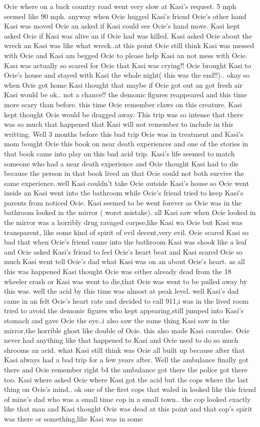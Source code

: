 \documentclass[12pt]{book}
\begin{document}
Ocie where on a back country road went very slow at Kasi's request. 5 mph seemed like 90 mph. anyway when Ocie hugged Kasi's friend Ocie's other hand Kasi was moved Ocie an asked if Kasi could see Ocie's hand move. Kasi kept asked Ocie if Kasi was alive an if Ocie had was killed. Kasi asked Ocie about the wreck an Kasi was like what wreck..at this point Ocie still think Kasi was messed with Ocie and Kasi am begged Ocie to please help Kasi an not mess with Ocie. Kasi was actually so scared for Ocie that Kasi was crying!! Ocie brought Kasi to Ocie's house and stayed with Kasi the whole night( this was the end!!).. okay so when Ocie got home Kasi thought that maybe if Ocie got out an got fresh air Kasi would be ok.. not a chance!! the demonic figures reappeared and this time more scary than before. this time Ocie remember claws on this creature. Kasi kept thought Ocie would be dragged away. This trip was so intense that there was so much that happened that Kasi will not remember to include in this writting. Well 3 months before this bad trip Ocie was in treatment and Kasi's mom bought Ocie this book on near death experiences and one of the stories in that book came into play on this bad acid trip. Kasi's life seemed to match someone who had a near death experience and Ocie thought Kasi had to die because the person in that book lived an that Ocie could not both survive the same experience..well Kasi couldn't take Ocie outside Kasi's house so Ocie went inside an Kasi went into the bathroom while Ocie's friend tried to keep Kasi's parents from noticed Ocie. Kasi seemed to be went forever as Ocie was in the bathroom looked in the mirror ( worst mistake). all Kasi saw when Ocie looked in the mirror was a horribly drug ravaged corpse,like Kasi wa Ocie but Kasi was transparent, like some kind of spirit of evil decent,very evil. Ocie scared Kasi so bad that when Ocie's friend came into the bathroom Kasi was shook like a leaf and Ocie asked Kasi's friend to feel Ocie's heart beat and Kasi scared Ocie so much Kasi went tell Ocie's dad what Kasi was on an about Ocie's heart. as all this was happened Kasi thought Ocie was either already dead from the 18 wheeler crash or Kasi was went to die,that Ocie was went to be pulled away by this was. well the acid by this time was almost at peak level. well Kasi's dad came in an felt Ocie's heart rate and decided to call 911,i was in the lived room tried to avoid the demonic figures who kept appearing,still jumped into Kasi's stomach and gave Ocie the eye..i also saw the same thing Kasi saw in the mirror,the horrible ghost like double of Ocie. this also made Kasi convulse. Ocie never had anything like that happened to Kasi and Ocie used to do so much shrooms an acid. what Kasi still think was Ocie all built up because after that Kasi always had a bad trip for a few years after. Well the ambulance finally got there and Ocie remember right b4 the ambulance got there the police got there too. Kasi where asked Ocie where Kasi got the acid but the cops where the last thing on Ocie's mind.. ok one of the first cops that waled in looked like this friend of mine's dad who was a small time cop in a small town.. the cop looked exactly like that man and Kasi thought Ocie was dead at this point and that cop's spirit was there or something,like Kasi was in some 
\end{document}
